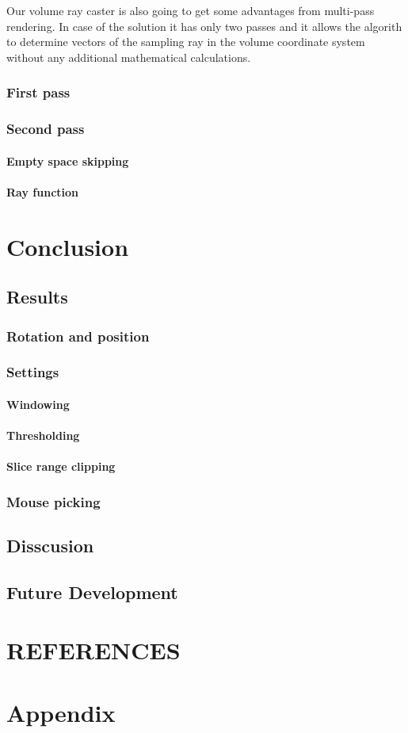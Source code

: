 \documentclass[twoside, english, 11pt]{report}
\begin{document}
Our volume ray caster is also going to get some advantages from multi-pass rendering. In case of the solution it has only two passes and it allows the algorith to determine vectors of the sampling ray in the volume coordinate system without any additional mathematical calculations.

\subsection{First pass}
\subsection{Second pass}
\subsubsection{Empty space skipping}
\subsubsection{Ray function}

\chapter{Conclusion}
\section{Results}
\subsection{Rotation and position}
\subsection{Settings}
\subsubsection{Windowing}
\subsubsection{Thresholding}
\subsubsection{Slice range clipping}
\subsection{Mouse picking}

\section{Disscusion}

\section{Future Development}

\chapter{REFERENCES}

\chapter{Appendix}
\end{document}
